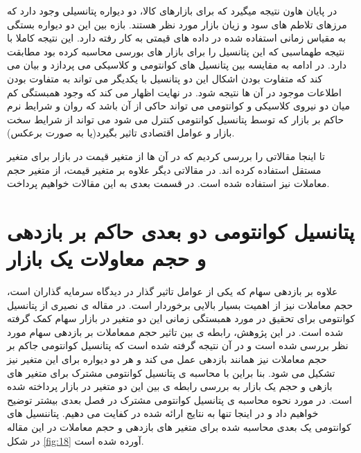 \documentclass[a4paper,titlepage,12pt,fleqn,oneside]{report}
\begin{document}
	در پایان هاون نتیجه میگیرد که برای بازارهای کالا، دو دیواره پتانسیلی وجود دارد که مرزهای تلاطم های سود و زیان بازار مورد نظر هستند. بازه بین این دو دیواره بستگی به مقیاس زمانی استفاده شده در داده های قیمتی به کار رفته دارد.  این نتیجه کاملا با نتیجه طهماسبی
	\cite{tahmaseb}
	که این پتانسیل را برای بازار های بورسی محاسبه کرده بود مطابقت دارد. در ادامه به مقایسه بین پتانسیل های کوانتومی و کلاسیکی می پردازد و بیان می کند که متفاوت بودن اشکال این دو پتانسیل با یکدیگر می تواند به متفاوت بودن اطلاعات موجود در آن ها نتیجه شود. در نهایت اظهار می کند که وجود همبستگی کم میان دو نیروی کلاسیکی و کوانتومی می تواند حاکی از آن باشد که روان و شرایط نرم حاکم بر بازار که توسط پتانسیل کوانتومی کنترل می شود می تواند از شرایط سخت بازار و عوامل اقتصادی تاثیر بگیرد(یا به صورت برعکس). 
	
	تا اینجا مقالاتی را بررسی کردیم که در آن ها از متغیر قیمت در بازار برای متغیر مستقل استفاده کرده اند. در مقالاتی دیگر علاوه بر متغیر قیمت، از متغیر حجم معاملات نیز استفاده شده است. در قسمت بعدی به این مقالات خواهیم پرداخت.
	
	\section{پتانسیل کوانتومی دو بعدی حاکم بر بازدهی و حجم معاولات یک بازار}
	علاوه بر بازدهی سهام که یکی از عوامل تاثیر گذار در دیدگاه سرمایه گذاران است، حجم معاملات نیز از اهمیت بسیار بالایی برخوردار است. در مقاله ی نصیری از پتانسیل کوانتومی برای تحقیق در مورد همبستگی زمانی این دو متغیر در بازار سهام کمک گرفته شده است.
	\cite{nas2}
	در این پژوهش، رابطه ی بین تاثیر  حجم ممعاملات بر بازدهی سهام مورد نظر بررسی شده است و در آن نتیجه گرفته شده است  که پتانسیل کوانتومی  جاکم بر حجم معاملات نیز همانند بازدهی عمل می کند و هر دو دیواره برای این متغیر نیز تشکیل می شود. بنا براین با محاسبه ی پتانسیل کوانتومی مشترک برای متغیر های بازهی و حجم یک بازار به بررسی رابطه ی بین این دو متغیر در بازار پرداخته شده است. 
	در مورد نحوه محاسبه ی پتانسیل کوانتومی مشترک در فصل بعدی بیشتر توضیح خواهیم داد و در اینجا تنها به نتایج ارائه شده در 
	\cite{nas2}
	کفایت می دهیم. 
	پتاننسیل های کوانتومی یک بعدی محاسبه شده برای متغیر های بازدهی و حجم معاملات در این مقاله در شکل 
	\ref{fig:18}
	آورده شده است.
	
\end{document}
